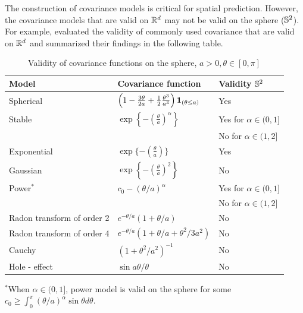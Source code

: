 The construction of covariance models is critical for spatial prediction. However, the covariance models that are valid on $\mathbb{R}^d$ may not be valid on the sphere ($\mathbb{S}^2$). For example, \cite{HuangZhangRobeson2011} evaluated the validity of commonly used covariance that are valid on $\mathbb{R}^d$ and summarized their findings in the following table.

	\begin{table}[H]
		\label{valid_cov_models}
		\centering
		\caption [Validity of Covariance Functions on The Sphere]{Validity of covariance functions on the sphere, $a >0,\theta \in [0,\pi]$}
		\label{tab:cov_sphere}
		\vskip 16pt
		\begin{tabular}[htb]{lll} \hline \hline
			Model & Covariance function & Validity  $\mathbb{S}^2$           \\   \hline Spherical  &
			$\left(1-\frac{3\theta}{2a} + \frac{1}{2}
			\frac{\theta^3}{a^3}\right){\bf 1}_{(\theta \le a)}$ & Yes   \\
			[2ex]
			Stable     & $\exp\left\{-\left(\frac{\theta}{a}\right)^\alpha\right\}$ & Yes for $\alpha \in (0,1]$  \\
			      &                     & No for $\alpha \in (1,2]$ \\ [2ex] \hspace{0.2in} Exponential &
			$\exp \{-\left(\frac{\theta}{a}\right) \}$ & Yes \\ [2ex]
			\hspace{0.2in} Gaussian & $\exp\left\{-\left(\frac{\theta}{a} \right)^2
			\right\}$  & No \\ [2ex]
			Power$^*$  & $c_0 - (\theta/a)^\alpha$ & Yes for  $\alpha \in (0,1] $  \\
			& & No for $\alpha \in (1,2]$ \\ [2ex]
			Radon transform of order 2         & $e^{-\theta/a}(1+\theta/a)$ &
			No        \\ [2ex] Radon transform of order 4         &
			$e^{-\theta/a} (1+\theta/a+\theta^2/3a^2)$  & No  \\ [2ex] Cauchy &
			$(1+\theta^2/a^2)^{-1}$ &  No      \\ [2ex] Hole - effect & $\sin
			a\theta / \theta$ & No    \\ \hline \hline
		\end{tabular}
	\vskip 8pt	
$^*$When $\alpha \in (0,1]$, power model is valid on the sphere  for some $c_0 \ge \int_0^\pi (\theta/a)^{\alpha} \sin \theta d \theta$.
		\end{table}
		 
